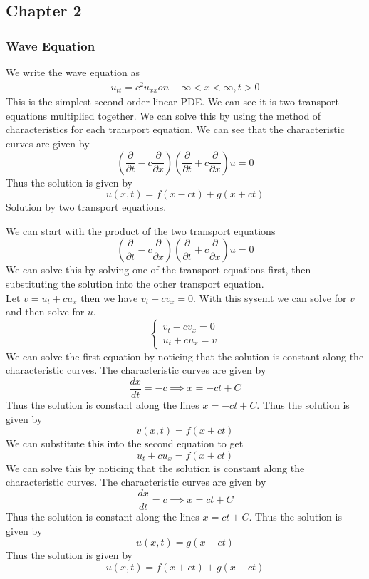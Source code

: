 \documentclass[answers,12pt,addpoints]{exam}
\begin{document}
    \subsection{Chapter 2}
    \subsubsection{Wave Equation}
    We write the wave equation as
    \begin{align*}
        u_{tt} = c^2 u_{xx} on -\infty < x < \infty, t > 0
    \end{align*}
    This is the simplest second order linear PDE. We can see it is two transport equations multiplied together. We can solve this by using the method of characteristics for each transport equation. We can see that the characteristic curves are given by
    $$ (\frac{\partial }{\partial t} -c \frac{\partial}{\partial x})(\frac{\partial}{\partial t} + c \frac{\partial}{\partial x})u = 0$$
    Thus the solution is given by
    $$ u(x, t) = f(x - ct) + g(x + ct)$$
    Solution by two transport equations.
    \begin{solution}
        We can start with the product of the two transport equations
        $$ (\frac{\partial }{\partial t} -c \frac{\partial}{\partial x})(\frac{\partial}{\partial t} + c \frac{\partial}{\partial x})u = 0$$
        We can solve this by solving one of the transport equations first, then substituting the solution into the other transport equation.\\
        Let $v = u_t + cu_x$ then we have $v_t - cv_x = 0$. With this sysemt we can solve for $v$ and then solve for $u$.
        $$ \begin{cases}
            v_t - cv_x = 0\\
            u_t + cu_x = v
        \end{cases}$$
        We can solve the first equation by noticing that the solution is constant along the characteristic curves. The characteristic curves are given by
        $$ \frac{dx}{dt} = -c \implies x = -ct + C$$
        Thus the solution is constant along the lines $x = -ct + C$. Thus the solution is given by
        $$ v(x, t) = f(x + ct)$$
        We can substitute this into the second equation to get
        $$ u_t + cu_x = f(x + ct)$$
        We can solve this by noticing that the solution is constant along the characteristic curves. The characteristic curves are given by
        $$ \frac{dx}{dt} = c \implies x = ct + C$$
        Thus the solution is constant along the lines $x = ct + C$. Thus the solution is given by
        $$ u(x, t) = g(x - ct)$$
        Thus the solution is given by
        $$ u(x, t) = f(x + ct) + g(x - ct)$$
    \end{solution}
\end{document}
